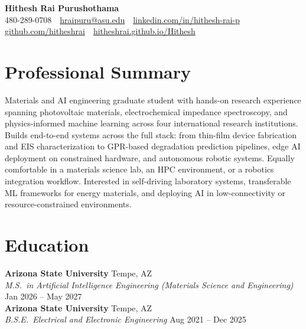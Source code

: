 \documentclass[10pt, letterpaper]{article}
\newcommand{\role}[2]{%
  \textit{#1} \hfill #2 \\[-2pt]%
}
\begin{document}
\begin{center}
  {\Large \textbf{Hithesh Rai Purushothama}} \\[4pt]
  \small
  480-289-0708 \,\textbar\,
  \href{mailto:hraipuru@asu.edu}{hraipuru@asu.edu} \,\textbar\,
  \href{https://linkedin.com/in/hithesh-rai-p}{linkedin.com/in/hithesh-rai-p} \,\textbar\,
  \href{https://github.com/hitheshrai}{github.com/hitheshrai} \,\textbar\,
  \href{https://hitheshrai.github.io/Hithesh}{hitheshrai.github.io/Hithesh}
\end{center}

\section*{Professional Summary}

Materials and AI engineering graduate student with hands-on research experience spanning
photovoltaic materials, electrochemical impedance spectroscopy, and physics-informed machine
learning across four international research institutions. Builds end-to-end systems across the
full stack: from thin-film device fabrication and EIS characterization to GPR-based degradation
prediction pipelines, edge AI deployment on constrained hardware, and autonomous robotic systems.
Equally comfortable in a materials science lab, an HPC environment, or a robotics integration
workflow. Interested in self-driving laboratory systems, transferable ML frameworks for energy
materials, and deploying AI in low-connectivity or resource-constrained environments.

\section*{Education}

\textbf{Arizona State University} \hfill Tempe, AZ \\
\role{M.S.\ in Artificial Intelligence Engineering (Materials Science and Engineering)}{Jan 2026 -- May 2027}

\vspace{4pt}
\textbf{Arizona State University} \hfill Tempe, AZ \\
\role{B.S.E.\ Electrical and Electronic Engineering}{Aug 2021 -- Dec 2025}

\end{document}
